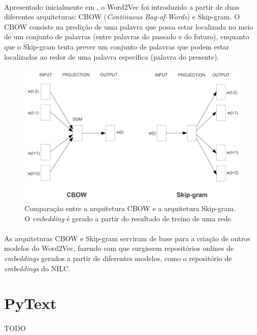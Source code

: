 \documentclass[grad,numbers]{coppe}
\begin{document}
  			\paragraph{}Apresentado inicialmente em \cite{word2vec-paper}, o Word2Vec foi introduzido a partir de duas diferentes arquiteturas: CBOW (\textit{Continuous Bag-of-Words}) e Skip-gram. O CBOW consiste na predição de uma palavra que possa estar localizada no meio de um conjunto de palavras (entre palavras do passado e do futuro), enquanto que o Skip-gram tenta prever um conjunto de palavras que podem estar localizadas ao redor de uma palavra específica (palavra do presente).
	  		\begin{figure}[h]
  				{\includegraphics[width=15cm]{word2vec-cbowskipgram.jpg}
  					\caption{Comparação entre a arquitetura CBOW e a arquitetura Skip-gram\cite{word2vec-paper}. O \textit{embedding} é gerado a partir do resultado de treino de uma rede.}
  					\label{fig:word2vec-cbowskipgram-fig}}
  			\end{figure}
	  		\paragraph{}As arquiteturas CBOW e Skip-gram serviram de base para a criação de outros modelos do Word2Vec, fazendo com que surgissem repositórios onlines de \textit{embeddings} gerados a partir de diferentes modelos, como o repositório de \textit{embeddings} do NILC\cite{nilc-repo}.
	
  \section{PyText}
  	\paragraph{}TODO
\end{document}
